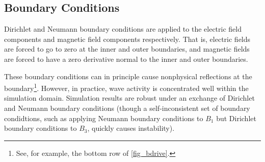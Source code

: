 




\subsection{Boundary Conditions}
  \label{sec_bcs}








Dirichlet and Neumann boundary conditions are applied to the electric field components and magnetic field components respectively. That is, electric fields are forced to go to zero at the inner and outer boundaries, and magnetic fields are forced to have a zero derivative normal to the inner and outer boundaries. 

These boundary conditions can in principle cause nonphysical reflections at the boundary\footnote{See, for example, the bottom row of \cref{fig_bdrive}. }. However, in practice, wave activity is concentrated well within the simulation domain. Simulation results are robust under an exchange of Dirichlet and Neumann boundary conditions (though a self-inconsistent set of boundary condidtions, such as applying Neumann boundary conditions to $B_1$ but Dirichlet boundary conditions to $B_3$, quickly causes instability). 





